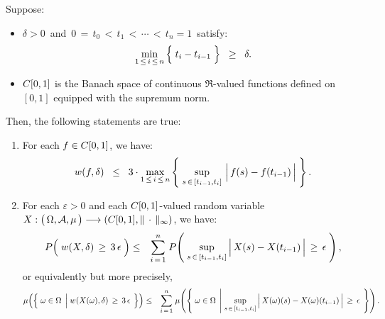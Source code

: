 \begin{proposition}
\mbox{}\vskip 0.2cm
\noindent
Suppose:
\begin{itemize}
\item	$\delta > 0$\, and \,$0 \,=\, t_{0} \,<\, t_{1} \,<\, \cdots \,<\, t_{n} = 1$\, satisfy:
		\begin{equation*}
		\min_{1\,\leq\,i\,\leq\,n}\left\{\;\overset{{\color{white}.}}{t}_{i} - t_{i-1}\;\right\}
		\;\; \geq \;\; \delta.
		\end{equation*}
\item	$C[0,1]$ is the Banach space of continuous $\Re$-valued functions defined on $[0,1]$
		equipped with the supremum norm.
\end{itemize}
Then, the following statements are true:
\begin{enumerate}
\item	For each $f \in C[0,1]$, we have:
		\begin{equation*}
		w(f,\delta) \;\; \leq \;\; 3 \cdot
			\max_{1\,\leq\,i\,\leq\,n}\left\{\;
				\sup_{s\,\in\,[t_{i-1},t_{i}]}\,\left\vert\,\overset{{\color{white}.}}{f}(s) - f(t_{i-1})\,\right\vert
			\;\right\}.
		\end{equation*}
\item	For each $\varepsilon > 0$ and each $C[0,1]$-valued random variable
		$X : \left(\,\Omega,\mathcal{A},\overset{{\color{white}.}}{\mu}\,\right) \longrightarrow \left(\Czo,\Vert\,\cdot\,\Vert_{\infty}\right)$,
		we have:
		\begin{eqnarray*}
		P\!\left(\;\overset{{\color{white}1}}{w}(X,\delta)\,\geq\,3\,\epsilon\;\right)
		&\leq& \overset{n}{\underset{i\,=\,1}{\sum}}\;
			P\!\left(\;
				\underset{s\,\in\,[t_{i-1},t_{i}]}{\sup}\left\vert\,\overset{{\color{white}.}}{X}(s)-X(t_{i-1})\,\right\vert\,\geq\,\epsilon
				\;\right),
		\end{eqnarray*}
		or equivalently but more precisely,
		\begin{eqnarray*}
		\mu\!\left(\left\{\;\omega\in\Omega\;\left\vert\;\overset{{\color{white}1}}{w}(X(\omega),\delta)\,\geq\,3\,\epsilon\right.\;\right\}\right)
		&\leq& \overset{n}{\underset{i\,=\,1}{\sum}}\;
			\mu\!\left(\left\{\; \omega\in\Omega \;\left\vert\;
				\underset{s\,\in\,[t_{i-1},t_{i}]}{\sup}
				\left\vert\,\overset{{\color{white}.}}{X}(\omega)(s)-X(\omega)(t_{i-1})\,\right\vert\,\geq\,\epsilon
				\right.\;\right\}\right).
		\end{eqnarray*}
\end{enumerate}
\end{proposition}
